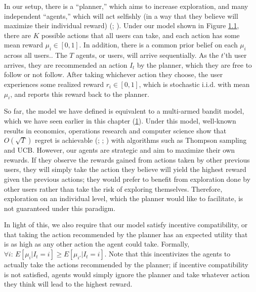 \documentclass[
  letterpaper,
  numbers=noenddot,
  DIV=11]{scrreprt}
\theoremstyle{plain}
\theoremstyle{definition}
\theoremstyle{remark}
\begin{document}
In our setup, there is a ``planner,'' which aims to increase
exploration, and many independent ``agents,'' which will act selfishly
(in a way that they believe will maximize their individual reward)
(;
). Under our model shown in Figure
\hyperref[fig-planner-agent]{1.1}, there are \(K\) possible actions that
all users can take, and each action has some mean reward
\(\mu_i \in [0, 1]\). In addition, there is a common prior belief on
each \(\mu_i\) across all users.. The \(T\) agents, or users, will
arrive sequentially. As the \(t\)'th user arrives, they are recommended
an action \(I_t\) by the planner, which they are free to follow or not
follow. After taking whichever action they choose, the user experiences
some realized reward \(r_i \in [0, 1]\), which is stochastic i.i.d. with
mean \(\mu_i\), and reports this reward back to the planner.

So far, the model we have defined is equivalent to a multi-armed bandit
model, which we have seen earlier in this chapter
(\hyperref[4optim]{1}). Under this model, well-known results in
economics, operations research and computer science show that
\(O(\sqrt{T})\) regret is achievable
(; ; ) with algorithms such as Thompson sampling and UCB. However, our
agents are strategic and aim to maximize their own rewards. If they
observe the rewards gained from actions taken by other previous users,
they will simply take the action they believe will yield the highest
reward given the previous actions; they would prefer to benefit from
exploration done by other users rather than take the risk of exploring
themselves. Therefore, exploration on an individual level, which the
planner would like to facilitate, is not guaranteed under this paradigm.

In light of this, we also require that our model satisfy incentive
compatibility, or that taking the action recommended by the planner has
an expected utility that is as high as any other action the agent could
take. Formally,
\(\forall i : \, E[\mu_i | I_t = i] \geq E[\mu_{i'} | I_t = i].\) Note
that this incentivizes the agents to actually take the actions
recommended by the planner; if incentive compatibility is not satisfied,
agents would simply ignore the planner and take whatever action they
think will lead to the highest reward.
\end{document}
